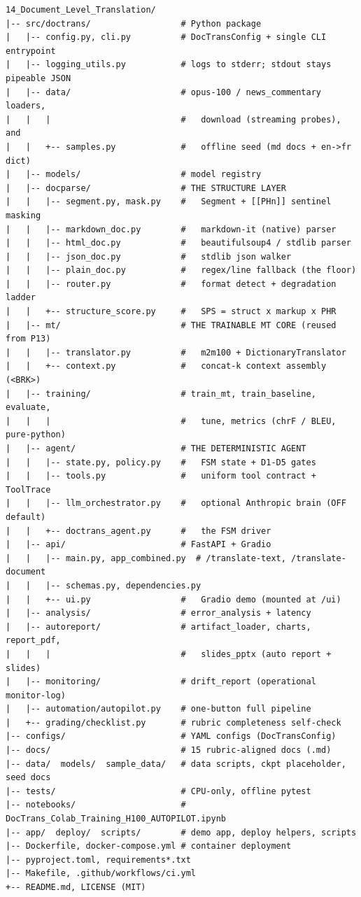 \documentclass[12pt,a4paper]{article}
\begin{document}
\begin{lstlisting}[basicstyle=\ttfamily\footnotesize]
14_Document_Level_Translation/
|-- src/doctrans/                  # Python package
|   |-- config.py, cli.py          # DocTransConfig + single CLI entrypoint
|   |-- logging_utils.py           # logs to stderr; stdout stays pipeable JSON
|   |-- data/                      # opus-100 / news_commentary loaders,
|   |   |                          #   download (streaming probes), and
|   |   +-- samples.py             #   offline seed (md docs + en->fr dict)
|   |-- models/                    # model registry
|   |-- docparse/                  # THE STRUCTURE LAYER
|   |   |-- segment.py, mask.py    #   Segment + [[PHn]] sentinel masking
|   |   |-- markdown_doc.py        #   markdown-it (native) parser
|   |   |-- html_doc.py            #   beautifulsoup4 / stdlib parser
|   |   |-- json_doc.py            #   stdlib json walker
|   |   |-- plain_doc.py           #   regex/line fallback (the floor)
|   |   |-- router.py              #   format detect + degradation ladder
|   |   +-- structure_score.py     #   SPS = struct x markup x PHR
|   |-- mt/                        # THE TRAINABLE MT CORE (reused from P13)
|   |   |-- translator.py          #   m2m100 + DictionaryTranslator
|   |   +-- context.py             #   concat-k context assembly (<BRK>)
|   |-- training/                  # train_mt, train_baseline, evaluate,
|   |   |                          #   tune, metrics (chrF / BLEU, pure-python)
|   |-- agent/                     # THE DETERMINISTIC AGENT
|   |   |-- state.py, policy.py    #   FSM state + D1-D5 gates
|   |   |-- tools.py               #   uniform tool contract + ToolTrace
|   |   |-- llm_orchestrator.py    #   optional Anthropic brain (OFF default)
|   |   +-- doctrans_agent.py      #   the FSM driver
|   |-- api/                       # FastAPI + Gradio
|   |   |-- main.py, app_combined.py  # /translate-text, /translate-document
|   |   |-- schemas.py, dependencies.py
|   |   +-- ui.py                  #   Gradio demo (mounted at /ui)
|   |-- analysis/                  # error_analysis + latency
|   |-- autoreport/                # artifact_loader, charts, report_pdf,
|   |   |                          #   slides_pptx (auto report + slides)
|   |-- monitoring/                # drift_report (operational monitor-log)
|   |-- automation/autopilot.py    # one-button full pipeline
|   +-- grading/checklist.py       # rubric completeness self-check
|-- configs/                       # YAML configs (DocTransConfig)
|-- docs/                          # 15 rubric-aligned docs (.md)
|-- data/  models/  sample_data/   # data scripts, ckpt placeholder, seed docs
|-- tests/                         # CPU-only, offline pytest
|-- notebooks/                     # DocTrans_Colab_Training_H100_AUTOPILOT.ipynb
|-- app/  deploy/  scripts/        # demo app, deploy helpers, scripts
|-- Dockerfile, docker-compose.yml # container deployment
|-- pyproject.toml, requirements*.txt
|-- Makefile, .github/workflows/ci.yml
+-- README.md, LICENSE (MIT)
\end{lstlisting}
\end{document}
